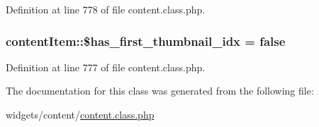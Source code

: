 Definition at line 778 of file content.\+class.\+php.

\hypertarget{classcontentItem_a78da7867160d34bf7e422524f6a78c37}{
\subsubsection[{\$has\+\_\+first\+\_\+thumbnail\+\_\+idx}]{\setlength{\rightskip}{0pt plus 5cm}content\+Item\+::\$has\+\_\+first\+\_\+thumbnail\+\_\+idx = false}}\label{classcontentItem_a78da7867160d34bf7e422524f6a78c37}


Definition at line 777 of file content.\+class.\+php.



The documentation for this class was generated from the following file\+:\begin{DoxyCompactItemize}
\item 
widgets/content/\hyperlink{content_8class_8php}{content.\+class.\+php}\end{DoxyCompactItemize}

